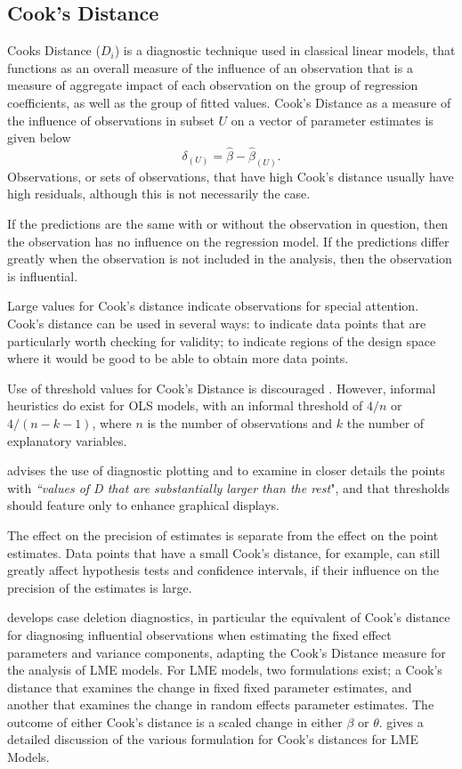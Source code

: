 \documentclass[12pt, a4paper]{report}
\theoremstyle{plain}
\theoremstyle{definition}
\theoremstyle{remark}
\begin{document}
\subsection{Cook's Distance}

 Cooks Distance ($D_{i}$) is a diagnostic technique used in classical linear models, that functions as an overall measure of the influence of an observation that is a measure of aggregate impact of each observation on the group of regression coefficients, as well as the group of fitted values.  Cook's Distance as a measure of the influence of observations in subset $U$ on a vector of parameter estimates is given below \citep{cook77}
\[ \delta_{(U)} = \hat{\beta} - \hat{\beta}_{(U)}.\]
Observations, or sets of observations, that have high Cook's distance usually have high residuals, although this is not necessarily the case.


If the predictions are the same with or without the observation in question, then the observation has no influence on the regression model. If the predictions differ greatly when the observation is not included in the analysis, then the observation is influential.

Large values for Cook's distance indicate observations for special attention. Cook's distance can be used in several ways: to indicate data points that are particularly worth checking for validity; to indicate regions of the design space where it would be good to be able to obtain more data points.

Use of threshold values for Cook's Distance is discouraged \citep{fox1991}. However, informal heuristics do exist for OLS models, with an informal threshold of $4/n$ or $4/(n-k-1)$, where $n$ is the number of observations and $k$ the number of explanatory variables.

\citet{fox1991} advises the use of diagnostic plotting and to examine in closer details the points with \textit{``values of D that are substantially larger than the rest}", and that thresholds should feature only to enhance graphical displays.

The effect on the precision of estimates is separate from the effect on the point estimates. Data points that have a small Cook's distance, for example, can still greatly affect hypothesis tests and confidence intervals, if their  influence on the precision of the estimates is large.

\citet{Christensen} develops  case deletion diagnostics, in particular the equivalent of  Cook's distance for diagnosing influential observations when estimating the fixed effect parameters and variance components, adapting the Cook's Distance measure for the analysis of LME models. For LME models, two formulations exist; a Cook's distance that examines the change in fixed fixed parameter estimates, and another that examines the change in random effects parameter estimates. The outcome of either Cook's distance is a scaled change in either $\beta$ or $\theta$. \citet{Zewotir} gives a detailed discussion of the various formulation for Cook's distances for LME Models.
\end{document}
